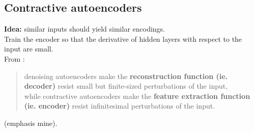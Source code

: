 \documentclass[../main.tex]{subfiles}
\begin{document}
\subsection{Contractive autoencoders}
\textbf{Idea:} similar inputs should yield similar encodings. \\
Train the encoder so that the derivative of hidden layers with respect to the input are small. \\
From \cite{what-regularized-autoencoders-learn}: \\
\blockquote{
 denoising autoencoders make the \textbf{reconstruction function (ie. decoder)} resist small but ﬁnite-sized perturbations of the input, \\
while contractive autoencoders make the \textbf{feature extraction function (ie. encoder)} resist infinitesimal perturbations of the input.
} (emphasis mine).
\end{document}
